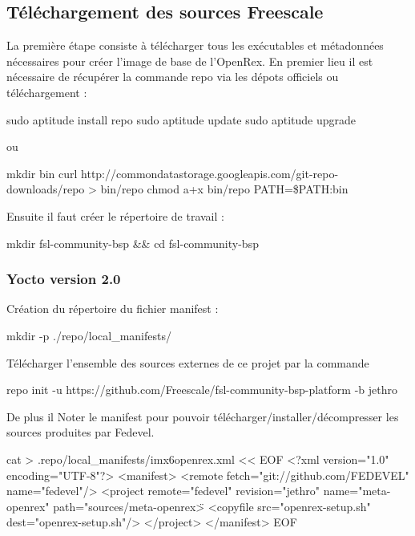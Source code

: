 \subsection{Téléchargement des sources Freescale}
La première étape consiste à télécharger tous les exécutables et métadonnées nécessaires pour créer l’image de base de l’OpenRex. En premier lieu il est nécessaire de récupérer la commande repo via les dépots officiels ou téléchargement :

\begin{tcolorbox}
	sudo aptitude install repo
	sudo aptitude update
	sudo aptitude upgrade
\end{tcolorbox}

ou

\begin{tcolorbox}
	mkdir bin
	curl http://commondatastorage.googleapis.com/git-repo-downloads/repo > bin/repo
	chmod a+x bin/repo
	PATH=\${PATH}:bin
\end{tcolorbox}

Ensuite il faut créer le répertoire de travail :

\begin{tcolorbox}
	mkdir fsl-community-bsp \&\& cd fsl-community-bsp
	\subsubsection{Yocto version 2.0}
	Création du répertoire du fichier manifest :
\end{tcolorbox}

\begin{tcolorbox}
	mkdir -p ./repo/local\_manifests/
\end{tcolorbox}

Télécharger l’ensemble des sources externes de ce projet par la commande

\begin{tcolorbox}
	repo init -u https://github.com/Freescale/fsl-community-bsp-platform -b jethro
\end{tcolorbox}

De plus il Noter le manifest pour pouvoir télécharger/installer/décompresser les sources produites par Fedevel.

\begin{tcolorbox}
	cat > .repo/local\_manifests/imx6openrex.xml << EOF
	<?xml version="1.0" encoding="UTF-8"?>
	<manifest>
	\hspace{3cm}<remote fetch="git://github.com/FEDEVEL" name="fedevel"/>
	\hspace{3cm}<project remote="fedevel" revision="jethro" name="meta-openrex" path="sources/meta-openrex\">
	\hspace{6cm}<copyfile src="openrex-setup.sh" dest="openrex-setup.sh"/>
	\hspace{3cm}</project>
	</manifest>
	EOF
\end{tcolorbox}

